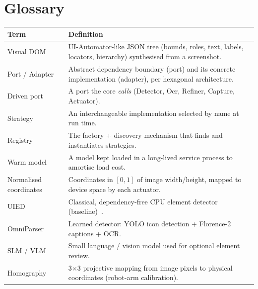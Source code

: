 \documentclass[11pt,a4paper]{report}
\begin{document}
\chapter{Glossary}
\begin{longtable}{@{}p{3.8cm}p{10.8cm}@{}}
\toprule
\textbf{Term} & \textbf{Definition} \\
\midrule
\endhead
Visual DOM & UI-Automator-like JSON tree (bounds, roles, text, labels, locators, hierarchy) synthesised from a screenshot. \\
Port / Adapter & Abstract dependency boundary (port) and its concrete implementation (adapter), per hexagonal architecture. \\
Driven port & A port the core \emph{calls} (Detector, Ocr, Refiner, Capture, Actuator). \\
Strategy & An interchangeable implementation selected by name at run time. \\
Registry & The factory + discovery mechanism that finds and instantiates strategies. \\
Warm model & A model kept loaded in a long-lived service process to amortise load cost. \\
Normalised coordinates & Coordinates in $[0,1]$ of image width/height, mapped to device space by each actuator. \\
UIED & Classical, dependency-free CPU element detector (baseline)~\cite{xie2020uied}. \\
OmniParser & Learned detector: YOLO icon detection + Florence-2 captions + OCR. \\
SLM / VLM & Small language / vision model used for optional element review. \\
Homography & 3$\times$3 projective mapping from image pixels to physical coordinates (robot-arm calibration). \\
\bottomrule
\end{longtable}



\end{document}
